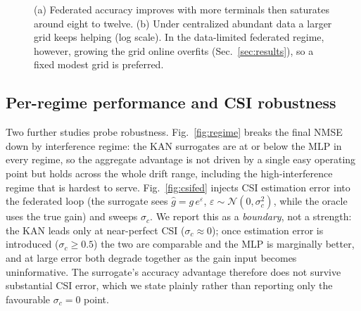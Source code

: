 \documentclass[journal]{IEEEtran}
\begin{document}
\begin{figure}[t]
\centering
{}
\caption{(a) Federated accuracy improves with more terminals then saturates around
eight to twelve. (b) Under centralized abundant data a larger grid keeps helping
(log scale). In the data-limited federated regime, however, growing the grid online
overfits (Sec.~\ref{sec:results}), so a fixed modest grid is preferred.}
\label{fig:scaling}
\end{figure}

\subsection{Per-regime performance and CSI robustness}
Two further studies probe robustness. Fig.~\ref{fig:regime} breaks the final NMSE
down by interference regime: the KAN surrogates are at or below the MLP in every
regime, so the aggregate advantage is not driven by a single easy operating point
but holds across the whole drift range, including the high-interference regime that
is hardest to serve. Fig.~\ref{fig:csifed} injects CSI estimation error into the
federated loop (the surrogate sees $\hat g=g\,e^{\varepsilon}$,
$\varepsilon\sim\mathcal N(0,\sigma_c^2)$, while the oracle uses the true gain) and
sweeps $\sigma_c$. We report this as a \emph{boundary}, not a strength: the KAN
leads only at near-perfect CSI ($\sigma_c\!\approx\!0$); once estimation error is
introduced ($\sigma_c\!\ge\!0.5$) the two are comparable and the MLP is marginally
better, and at large error both degrade together as the gain input becomes
uninformative. The surrogate's accuracy advantage therefore does not survive
substantial CSI error, which we state plainly rather than reporting only the
favourable $\sigma_c\!=\!0$ point.
\end{document}
